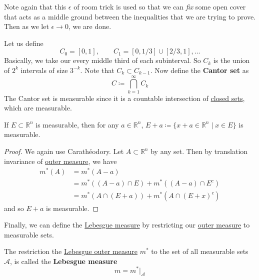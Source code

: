   Note again that this $\epsilon$ of room trick is used so that we can \textit{fix} some open cover that acts as a middle ground between the inequalities that we are trying to prove. Then as we let $\epsilon \to 0$, we are done. 

  \begin{example}
    \label{ex:cantor-set-is-measurable}
    Let us define 
    \begin{equation}
      C_0 = [0, 1], \qquad C_1 = [0, 1/3] \cup [2/3, 1], \ldots
    \end{equation}
    Basically, we take our every middle third of each subinterval. So $C_k$ is the union of $2^k$ intervals of size $3^{-k}$. Note that $C_k \subset C_{k-1}$. Now define the \textbf{Cantor set} as 
    \begin{equation}
      C \coloneqq \bigcap_{k=1}^\infty C_k
    \end{equation}
    The Cantor set is measurable since it is a countable intersection of \hyperref[pst-def:closed]{closed sets}, which are measurable. 
  \end{example}

  \begin{theorem}
    \label{thm:translations-of-sets-are-measurable}
    If $E \subset \mathbb{R}^n$ is measurable, then for any $a \in \mathbb{R}^n$, $E + a \coloneqq \{x + a \in \mathbb{R}^n \mid x \in E \}$ is measurable. 
  \end{theorem}
  \begin{proof}
    We again use Carathéodory. Let $A \subset \mathbb{R}^n$ by any set. Then by translation invariance of \hyperref[def:outer-measure]{outer measure}, we have 
    \begin{align}
      m^\ast(A) & = m^\ast (A - a) \\ 
                & = m^\ast ((A - a) \cap E) + m^\ast((A - a) \cap E^c) \\ 
                & = m^\ast (A \cap (E + a)) + m^\ast (A \cap (E + x)^c)
    \end{align}
    and so $E + a$ is measurable. 
  \end{proof}

	Finally, we can define the \hyperref[def:lebesgue-measure]{Lebesgue measure} by restricting our \hyperref[def:outer-measure]{outer measure} to measurable sets. 

  \begin{definition}
    \label{def:lebesgue-measure}
    The restriction the \hyperref[def:lebesgue-outer-measure]{Lebesgue outer measure} $m^\ast$ to the set of all measurable sets $\mathcal{A}$, is called the \textbf{Lebesgue measure} 
    \begin{equation}
      m = m^\ast \big|_{\mathcal{A}}
    \end{equation}
  \end{definition}

